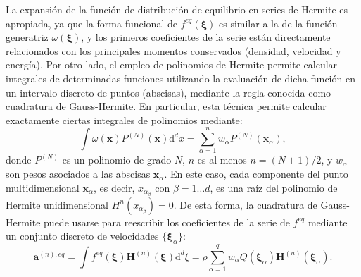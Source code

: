 La expansi\'on de la funci\'on de distribuci\'on de equilibrio \feqvar{} en series de Hermite es apropiada, ya que la forma funcional de $f^{eq}(\bm{\xi})$ es similar a la de la funci\'on generatriz $\omega(\bm{\xi})$, y los primeros coeficientes de la serie est\'an directamente relacionados con los principales momentos conservados (densidad, velocidad y energ\'ia). Por otro lado, el empleo de polinomios de Hermite permite calcular integrales de determinadas funciones utilizando la evaluaci\'on de dicha funci\'on en un intervalo discreto de puntos (abscisas), mediante la regla conocida como cuadratura de Gauss-Hermite. En particular, esta t\'ecnica permite calcular exactamente ciertas integrales de polinomios mediante:
\begin{equation}
	\int \omega(\bm{x}) P^{(N)}(\bm{x})\mbox{d}^dx = \sum_{\alpha=1}^{n} w_{\alpha} P^{(N)}(\bm{x}_{\alpha}),
\end{equation}
donde $P^{(N)}$ es un polinomio de grado $N$, $n$ es al menos $n=(N+1)/2$, y $w_{\alpha}$ son pesos asociados a las abscisas $\bm{x}_{\alpha}$. En este caso, cada componente del punto multidimensional $\bm{x}_{\alpha}$, es decir, $x_{\alpha_{\beta}}$ con $\beta=1\ldots d$, es una ra\'iz del polinomio de Hermite unidimensional $H^{n}(x_{\alpha _{\beta}})=0$. De esta forma, la cuadratura de Gauss-Hermite puede usarse para reescribir los coeficientes de la serie de $f^{eq}$ mediante un conjunto discreto de velocidades $\{ \bm{\xi}_{\alpha} \}$:
\begin{equation}
	\bm{a}^{(n),eq} = \int f^{eq}(\bm{\xi}) \bm{H}^{(n)}(\bm{\xi}) \mbox{d}^d \xi 
	= \rho \sum_{\alpha=1}^q w_{\alpha} Q(\bm{\xi}_{\alpha})\bm{H}^{(n)}(\bm{\xi}_{\alpha}).
\end{equation}

